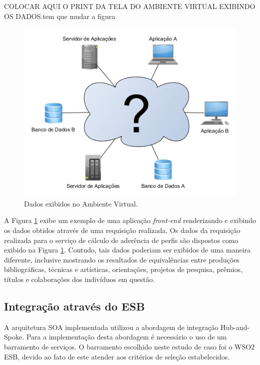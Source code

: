 COLOCAR AQUI O PRINT DA TELA DO AMBIENTE VIRTUAL EXIBINDO OS DADOS.tem que mudar a figura
\begin{figure}[!hbt]
\centering
\includegraphics[scale=0.7]{figuras/ambiente_virtual.png}
\caption{Dados exibidos no Ambiente Virtual.}
\label{print_ambiente_virtual}
\end{figure}

A Figura \ref{print_ambiente_virtual} exibe um exemplo de uma aplicação \textit{front-end} renderizando e exibindo os dados obtidos através de uma requisição realizada. Os dados da requisição realizada para o serviço de cálculo de aderência de perfis são dispostos como exibido na Figura \ref{print_ambiente_virtual}. Contudo, tais dados poderiam ser exibidos de uma maneira diferente, inclusive mostrando os resultados de equivalências entre produções bibliográficas, técnicas e artísticas, orientações, projetos de pesquisa, prêmios, títulos e colaborações dos indivíduos em questão.

\subsection{Integração através do ESB}
A arquitetura SOA implementada utilizou a abordagem de integração Hub-and-Spoke. Para a implementação desta abordagem é necessário o uso de um barramento de serviços. O barramento escolhido neste estudo de caso foi o WSO2 ESB, devido ao fato de este atender aos critérios de seleção estabelecidos. 

